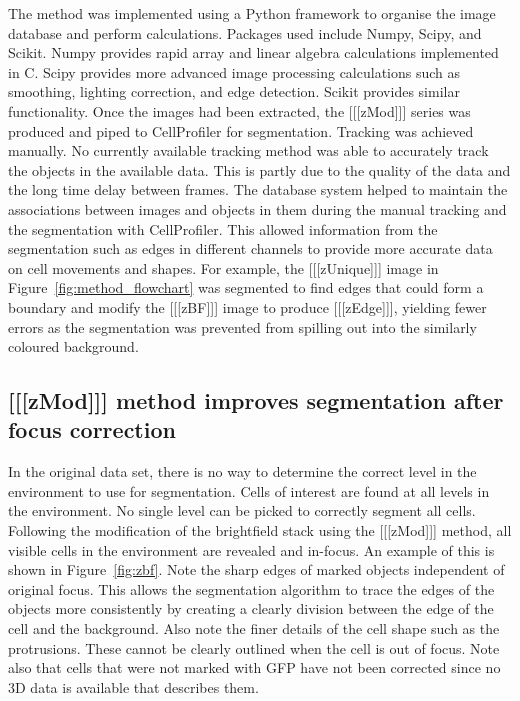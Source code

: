 \documentclass[preprint,11pt,5p,twocolumn]{elsarticle}
\begin{document}
The method was implemented using a Python framework to organise the image database and perform calculations. Packages used include Numpy, Scipy, and Scikit. Numpy provides rapid array and linear algebra calculations implemented in C. Scipy provides more advanced image processing calculations such as smoothing, lighting correction, and edge detection. Scikit provides similar functionality. Once the images had been extracted, the [[[zMod]]] series was produced and piped to CellProfiler for segmentation. Tracking was achieved manually. No currently available tracking method was able to accurately track the objects in the available data. This is partly due to the quality of the data and the long time delay between frames. The database system helped to maintain the associations between images and objects in them during the manual tracking and the segmentation with CellProfiler. This allowed information from the segmentation such as edges in different channels to provide more accurate data on cell movements and shapes. For example, the [[[zUnique]]] image in Figure~\ref{fig:method_flowchart} was segmented to find edges that could form a boundary and modify the [[[zBF]]] image to produce [[[zEdge]]], yielding fewer errors as the segmentation was prevented from spilling out into the similarly coloured background.

\subsection{[[[zMod]]] method improves segmentation after focus correction}

In the original data set, there is no way to determine the correct level in the environment to use for segmentation. Cells of interest are found at all levels in the environment. No single level can be picked to correctly segment all cells. Following the modification of the brightfield stack using the [[[zMod]]] method, all visible cells in the environment are revealed and in-focus. An example of this is shown in Figure~\ref{fig:zbf}. Note the sharp edges of marked objects independent of original focus. This allows the segmentation algorithm to trace the edges of the objects more consistently by creating a clearly division between the edge of the cell and the background. Also note the finer details of the cell shape such as the protrusions. These cannot be clearly outlined when the cell is out of focus. Note also that cells that were not marked with GFP have not been corrected since no 3D data is available that describes them.
\end{document}
